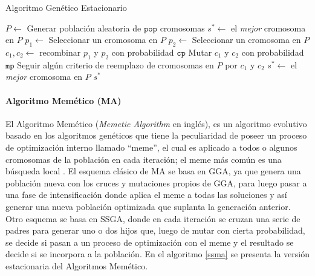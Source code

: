 \begin{algorithm}
\caption{Algoritmo Genético Estacionario}
\label{sga}
\begin{algorithmic}[1]


\State $P \gets$ Generar población aleatoria de $\texttt{pop}$ cromosomas
\State $s^* \gets $ el \emph{mejor} cromosoma en $P$
	\State $p_1 \gets$ Seleccionar un cromosoma en $P$
	\State $p_2 \gets$ Seleccionar un cromosoma en $P$
	\State $c_1, c_2 \gets $ recombinar $p_1$ y $p_2$ con probabilidad $\texttt{cp}$
	\State Mutar $c_1$ y $c_2$ con probabilidad $\texttt{mp}$
	\State Seguir algún criterio de reemplazo de cromosomas en $P$ por $c_1$ y $c_2$
		\State $s^* \gets$ el \emph{mejor} cromosoma en $P$
	\EndIf
\EndWhile
\State \Return $s^*$

\end{algorithmic}
\end{algorithm}

\paragraph{Algoritmo Memético (MA)}

El Algoritmo Memético (\emph{Memetic Algorithm} en inglés), es un algoritmo evolutivo basado en los algoritmos genéticos que tiene la peculiaridad de poseer un proceso de optimización interno llamado ``meme'', el cual es aplicado a todos o algunos cromosomas de la población en cada iteración; el meme más común es una búsqueda local \cite{neri2012memetic}. El esquema clásico de MA se basa en  GGA, ya que genera una población nueva con los cruces y mutaciones propios de GGA, para luego pasar a una fase de intensificación donde aplica el meme a todas las soluciones y así generar una nueva población optimizada que suplanta la generación anterior. Otro esquema se basa en SSGA, donde en cada iteración se cruzan una serie de padres para generar uno o dos hijos que, luego de mutar con cierta probabilidad, se decide si pasan a un proceso de optimización con el meme y el resultado se decide si se incorpora a la población.  En el algoritmo \ref{ssma} se presenta la versión estacionaria del Algoritmos Memético.

